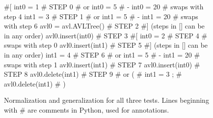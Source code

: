 \begin{figure}[t]
{\scriptsize
\begin{code}
\textcolor{black!60}{\#[}
int0 = 1                              \textcolor{black!60}{\# STEP 0}
\textcolor{black!60}{\#  or int0 = 5 }
\textcolor{black!60}{\#   - int0 = 20} 
\textcolor{black!60}{\#  swaps with step 4}
int1 = 3                              \textcolor{black!60}{\# STEP 1}
\textcolor{black!60}{\#  or int1 = 5 }
\textcolor{black!60}{\#   - int1 = 20} 
\textcolor{black!60}{\#  swaps with step 6}
avl0 = avl.AVLTree()                  \textcolor{black!60}{\# STEP 2}
\textcolor{black!60}{\#] (steps in [] can be in any order)}
avl0.insert(int0)                     \textcolor{black!60}{\# STEP 3}
\textcolor{black!60}{\#[}
int0 = 2                              \textcolor{black!60}{\# STEP 4}
\textcolor{black!60}{\#  swaps with step 0}
avl0.insert(int1)                     \textcolor{black!60}{\# STEP 5}
\textcolor{black!60}{\#] (steps in [] can be in any order)}
int1 = 4                              \textcolor{black!60}{\# STEP 6}
\textcolor{black!60}{\#  or int1 = 5 }
\textcolor{black!60}{\#   - int1 = 20} 
\textcolor{black!60}{\#  swaps with step 1}
avl0.insert(int1)                     \textcolor{black!60}{\# STEP 7}
avl0.insert(int0)                     \textcolor{black!60}{\# STEP 8}
avl0.delete(int1)                     \textcolor{black!60}{\# STEP 9}
\textcolor{black!60}{\#  or (}
\textcolor{black!60}{\#      int1 = 3  ;}
\textcolor{black!60}{\#      avl0.delete(int1) }
\textcolor{black!60}{\#     )}
\end{code}
}
\caption{\scriptsize{Normalization and generalization for all three tests.
  Lines beginning with \# are comments in Python, used for annotations.}}
\label{normalgen}
\end{figure}

